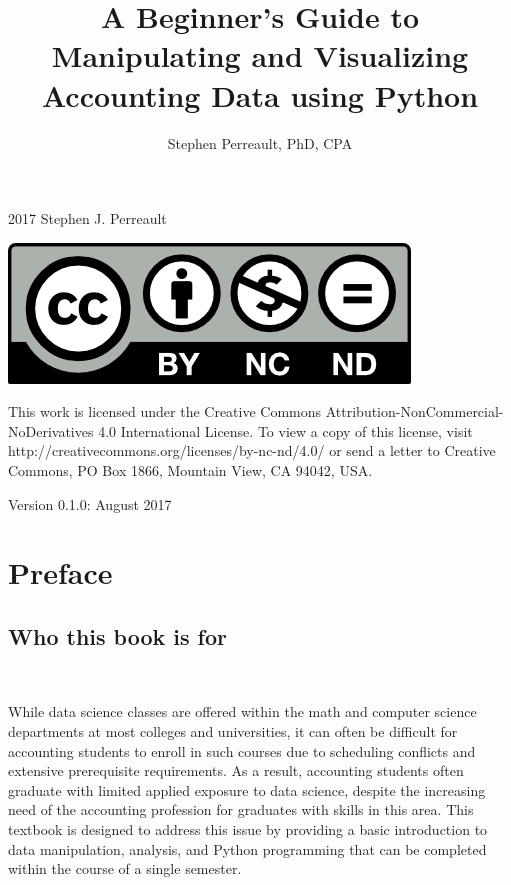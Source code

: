 \documentclass{book}
\begin{document}
\frontmatter
\pagestyle{plain}
\begin{titlepage}
	\title {\huge \textbf{A Beginner's Guide to Manipulating and Visualizing Accounting Data using Python }}
	\date{}
	\author{Stephen Perreault, PhD, CPA}
	\maketitle
\end{titlepage}
\begingroup
	\parindent 0pt
	\parskip \baselineskip 
	\textcopyright{} 2017 Stephen J. Perreault 
	
	\begin {center}
	\includegraphics  [scale=1.5]{creative_commons_license}
	\end {center}
	
	This work is licensed under the Creative Commons Attribution-NonCommercial-NoDerivatives 4.0 International License. To view a copy of this license, visit http://creativecommons.org/licenses/by-nc-nd/4.0/ or send a letter to Creative Commons, PO Box 1866, Mountain View, CA 94042, USA.
	
	Version 0.1.0: August 2017
\endgroup
\tableofcontents


\mainmatter	
\parindent 0pt
\parskip \baselineskip 

\chapter{Preface}
\section{Who this book is for}\

 While data science classes are offered within the math and computer science departments at most colleges and universities, it can often be difficult for accounting students to enroll in such courses due to scheduling conflicts and extensive prerequisite requirements. As a result, accounting students often graduate with limited applied exposure to data science, despite the increasing need of the accounting profession for graduates with skills in this area. This textbook is designed to address this issue by providing a basic introduction to data manipulation, analysis, and Python programming that can be completed within the course of a single semester. 
\end{document}
